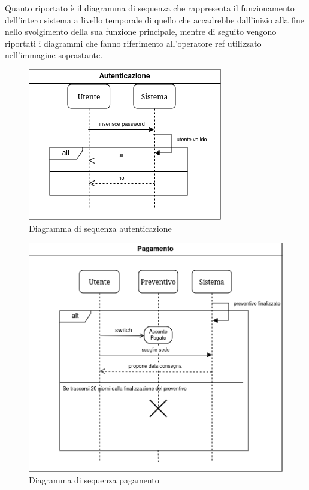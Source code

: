 \documentclass[a4paper, 11pt,oneside]{book}
\newcommand{\spacing}{\par\bigskip\noindent}
\begin{document}
        \spacing
        Quanto riportato è il diagramma di sequenza che rappresenta il funzionamento dell'intero sistema a livello temporale di quello che accadrebbe dall'inizio alla fine nello svolgimento della sua funzione principale,
        mentre di seguito vengono riportati i diagrammi che fanno riferimento all'operatore ref utilizzato nell'immagine soprastante.
        \begin{figure}[H]
            \centering
            \includegraphics[scale=0.75]{sequence_diagram_rif_autenticazione.png}
            \caption{Diagramma di sequenza autenticazione}
            \label{fig:diagramma_sequenza_autenticazione}
        \end{figure}
        \begin{figure}[H]
            \centering
            \includegraphics[scale=0.75]{sequence_diagram_rif_pagamento.png}
            \caption{Diagramma di sequenza pagamento}
            \label{fig:diagramma_sequenza_pagamento}
        \end{figure}
\end{document}
